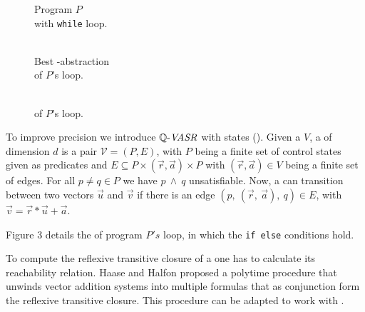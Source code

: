 \begin{minipage}[t]{0.3\linewidth} \centering
	\begin{figure}[H]
		
		\caption{Program $P$ \\ with \texttt{while} loop.}
	\end{figure}
\end{minipage}
\begin{minipage}[t]{0.35\linewidth} \centering
	\begin{figure}[H]
			
			\caption{\\ Best \qvasr-abstraction \\ of $P$'s loop.}
	\end{figure}
\end{minipage}
\begin{minipage}[t]{0.3\linewidth} \centering
	\begin{figure}[H]
		
		\caption{\\ \qvasrs of $P$'s loop.}
	\end{figure}
\end{minipage}
\vspace*{1cm}

To improve precision we introduce $\mathit{\mathbb{Q} \text{-}VASR}$ with states (\qvasrs). Given a \qvasr $V$, a \qvasrs of dimension $d$ is a pair $\mathcal{V} = (P, E)$, with $P$ being a finite set of control states given as predicates and $E \subseteq P \times (\vec{r}, \vec{a}) \times P$ with $(\vec{r}, \vec{a}) \in V$ being a finite set of edges. For all $p \neq q \in P$ we have $p\ \land\ q$ unsatisfiable. Now, a \qvasrs can transition between two vectors $\vec{u}$ and $\vec{v}$ if there is an edge $(p,\ (\vec{r},\ \vec{a}),\ q) \in E$, with $\vec{v} = \vec{r} * \vec{u} + \vec{a}$. \par
Figure 3 details the \qvasrs of program $P's$ loop, in which the \texttt{if else} conditions hold. \par
To compute the reflexive transitive closure of a \qvasrs one has to calculate its reachability relation. Haase and Halfon \cite{10.1007/978-3-319-11439-2_9} proposed a polytime procedure that unwinds vector addition systems into multiple formulas that as conjunction form the reflexive transitive closure. This procedure can be adapted to work with \qvasrs. \\ \par

